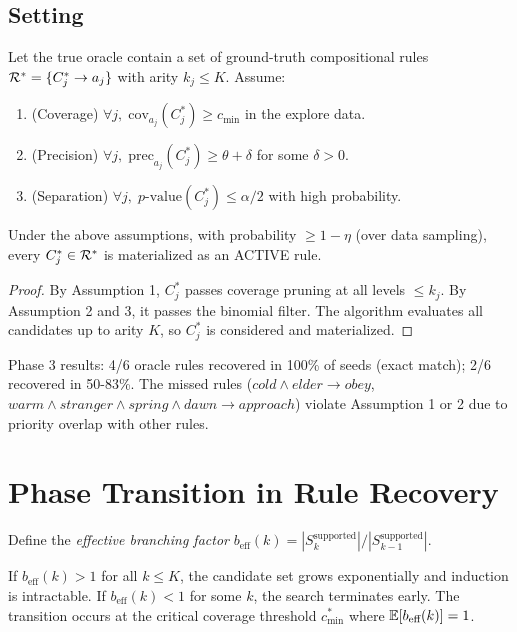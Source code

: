 \subsection{Setting}
Let the true oracle contain a set of ground-truth compositional rules $\mathcal{R}^* = \{C_j^* \to a_j\}$ with arity $k_j \leq K$. Assume:
\begin{enumerate}
    \item (Coverage) $\forall j,\; \mathrm{cov}_{a_j}(C_j^*) \geq c_{\min}$ in the explore data.
    \item (Precision) $\forall j,\; \mathrm{prec}_{a_j}(C_j^*) \geq \theta + \delta$ for some $\delta > 0$.
    \item (Separation) $\forall j,\; p\text{-value}(C_j^*) \leq \alpha/2$ with high probability.
\end{enumerate}

\begin{theorem}
Under the above assumptions, with probability $\geq 1 - \eta$ (over data sampling), every $C_j^* \in \mathcal{R}^*$ is materialized as an ACTIVE rule.
\end{theorem}
\begin{proof}
By Assumption 1, $C_j^*$ passes coverage pruning at all levels $\leq k_j$. By Assumption 2 and 3, it passes the binomial filter. The algorithm evaluates all candidates up to arity $K$, so $C_j^*$ is considered and materialized.
\end{proof}

\begin{remark}
Phase 3 results: 4/6 oracle rules recovered in 100\% of seeds (exact match); 2/6 recovered in 50-83\%. The missed rules (\texttt{$cold \land elder \to obey$}, \texttt{$warm \land stranger \land spring \land dawn \to approach$}) violate Assumption 1 or 2 due to priority overlap with other rules.
\end{remark}

\section{Phase Transition in Rule Recovery}

Define the \emph{effective branching factor} $b_{\text{eff}}(k) = |S_k^{\text{supported}}| / |S_{k-1}^{\text{supported}}|$.

\begin{proposition}
If $b_{\text{eff}}(k) > 1$ for all $k \leq K$, the candidate set grows exponentially and induction is intractable. If $b_{\text{eff}}(k) < 1$ for some $k$, the search terminates early. The transition occurs at the critical coverage threshold $c_{\min}^*$ where $\mathbb{E}[b_{\text{eff}}(k)] = 1$.
\end{proposition}


